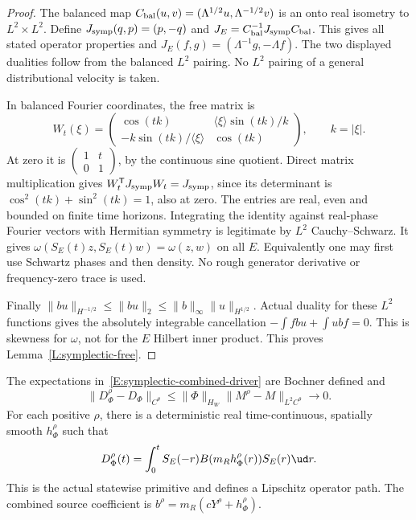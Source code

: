 \begin{proof}
  The balanced map $C_{\rm bal}(u,v)=(\Lambda^{1/2}u,\Lambda^{-1/2}v)$
  is an onto real isometry to $L^2\times L^2$.
  Define $J_{\rm symp}(q,p)=(p,-q)$ and
  $J_E=C_{\rm bal}^{-1}J_{\rm symp}C_{\rm bal}$.
  This gives all stated operator properties and
  $J_E(f,g)=(\Lambda^{-1}g,-\Lambda f)$.
  The two displayed dualities follow from the balanced $L^2$ pairing.
  No $L^2$ pairing of a general distributional velocity is taken.

  In balanced Fourier coordinates, the free matrix is
  \[
    W_t(\xi)=
    \begin{pmatrix}
      \cos(tk)&\langle\xi\rangle\sin(tk)/k\\
      -k\sin(tk)/\langle\xi\rangle&\cos(tk)
    \end{pmatrix},\qquad k=|\xi|.
  \]
  At zero it is $\left(\begin{smallmatrix}1&t\\0&1\end{smallmatrix}\right)$,
  by the continuous sine quotient.
  Direct matrix multiplication gives
  $W_t^{\mathsf T}J_{\rm symp}W_t=J_{\rm symp}$, since its
  determinant is $\cos^2(tk)+\sin^2(tk)=1$, also at zero.
  The entries are real, even and bounded on finite time horizons.
  Integrating the identity against real-phase Fourier vectors
  with Hermitian symmetry is legitimate by $L^2$ Cauchy--Schwarz.
  It gives $\omega(S_E(t)z,S_E(t)w)=\omega(z,w)$ on all $E$.
  Equivalently one may first use Schwartz phases and then density.
  No rough generator derivative or frequency-zero trace is used.

  Finally $\|bu\|_{H^{-1/2}}\le\|bu\|_2
  \le\|b\|_\infty\|u\|_{H^{1/2}}$.
  Actual duality for these $L^2$ functions gives the absolutely
  integrable cancellation $-\int fbu+\int ubf=0$.
  This is skewness for $\omega$, not for the $E$ Hilbert inner product.
  This proves Lemma~\ref{L:symplectic-free}.
\end{proof}

\begin{lemma}
  \label{L:symplectic-source-mean}
  The expectations in~\eqref{E:symplectic-combined-driver} are
  Bochner defined and
  \begin{equation}\label{E:symplectic-mean-convergence}
    \|D_\Phi^\rho-D_\Phi\|_{C^\theta}
    \le\|\Phi\|_{H_W}\|M^\rho-M\|_{L^2C^\theta}\longrightarrow0 .
  \end{equation}
  For each positive $\rho$, there is a deterministic real
  time-continuous, spatially smooth $h_\Phi^\rho$ such that
  \begin{equation}\label{E:symplectic-source-primitive}
    D_\Phi^\rho(t)
    =\int_0^t S_E(-r)B(m_Rh_\Phi^\rho(r))S_E(r)\ud r .
  \end{equation}
  This is the actual statewise primitive and defines a Lipschitz
  operator path. The combined source coefficient is
  $b^\rho=m_R(cY^\rho+h_\Phi^\rho)$.
\end{lemma}

